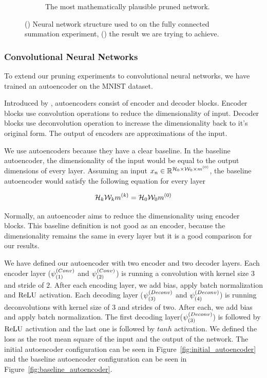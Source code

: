 \begin{figure}[h!]
\begin{center}
\begin{subfigure}{.5\textwidth}
\begin{center}
        \caption{The most mathematically plausible pruned network.}
        \label{fig:optimum_fc_summation}
          \end{center}
  \end{subfigure}
  \end{center}
  \caption{() Neural network structure used to on the fully connected summation experiment, () the result we are trying to achieve.}
  \label{fig:fc_node_pruning}
\end{figure}

\subsubsection{Convolutional Neural Networks}
To extend our pruning experiments to convolutional neural networks, we have trained an autoencoder on the MNIST dataset. 

Introduced by \cite{hinton2006reducing}, autoencoders consist of encoder and decoder blocks. Encoder blocks use convolution operations to reduce the dimensionality of input. Decoder blocks use deconvolution operation to increase the dimensionality back to it's original form. The output of encoders are approximations of the input. 

We use autoencoders because they have a clear baseline. In the baseline autoencoder, the dimensionality of the input would be equal to the output dimensions of every layer. Assuming an input $x_{n} \in \mathbb{R}^{ \mathcal{H}_{0} \times \mathcal{W}_{0} \times m^{(0)}}$, the baseline autoencoder would satisfy the following equation for every layer

$$ \mathcal{H}_{k}  \mathcal{W}_{k} m^{(k)} = \mathcal{H}_{0} \mathcal{W}_{0}  m^{(0)} $$

Normally, an autoencoder aims to reduce the dimensionality using encoder blocks. This baseline definition is not good as an encoder, because the dimensionality remains the same in every layer but it is a good comparison for our results.

We have defined our autoencoder with two encoder and two decoder layers. Each encoder layer ($\psi^{(Conv)}_{(1)}$ and $\psi^{(Conv)}_{(2)}$) is running a convolution with kernel size $3$ and stride of $2$. After each encoding layer, we add bias, apply batch normalization and $\textrm{ReLU}$ activation. Each decoding layer ($\psi^{(Deconv)}_{(3)}$ and $\psi^{(Deconv)}_{(4)}$) is running deconvolutions with kernel size of 3 and strides of two. After each, we add bias and apply batch normalization. The first decoding layer($\psi^{(Deconv)}_{(3)}$) is followed by $\textrm{ReLU}$ activation and the last one is followed by $tanh$ activation. We defined the loss as the root mean square of the input and the output of the network. The initial autoencoder configuration can be seen in Figure~\ref{fig:initial_autoencoder} and the baseline autoencoder configuration can be seen in Figure~\ref{fig:baseline_autoencoder}.

